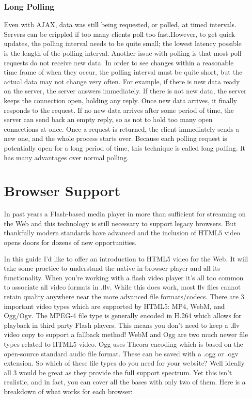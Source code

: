 	\subsubsection{Long Polling}
	Even with AJAX, data was still being requested, or polled, at timed intervals. Servers can be crippled if too many clients poll too fast.However, to get quick updates, the polling interval needs to be quite small; the lowest latency possible is the length of the polling interval. Another issue with polling is that most poll requests do not receive new data. In order to see changes within a reasonable time frame of when they occur, the polling interval must be quite short, but the actual data may not change very often.
	For example, if there is new data ready on the server, the server answers immediately. If there is not new data, the server keeps the connection open, holding any reply. Once new data arrives, it finally responds to the request. If no new data arrives after some period of time, the server can send back an empty reply, so as not to hold too many open connections at once. Once a request is returned, the client immediately sends a new one, and the whole process starts over. Because each polling request is potentially open for a long period of time, this technique is called long polling. It has many advantages over normal polling.

\section{Browser Support}
	In past years a Flash-based media player in more than sufficient for streaming on the Web and this technology is still necessary to support legacy browsers. But thankfully modern standards have advanced and the inclusion of HTML5 video opens doors for dozens of new opportunities.

	In this guide I’d like to offer an introduction to HTML5 video for the Web. It will take some practice to understand the native in-browser player and all its functionality. When you’re working with a flash video player it’s all too common to associate all video formats in .flv. While this does work, most flv files cannot retain quality anywhere near the more advanced file formats/codecs. There are 3 important video types which are supported by HTML5: MP4, WebM, and Ogg/Ogv. The MPEG-4 file type is generally encoded in H.264 which allows for playback in third party Flash players. This means you don’t need to keep a .flv video copy to support a fallback method! WebM and Ogg are two much newer file types related to HTML5 video. Ogg uses Theora encoding which is based on the open-source standard audio file format. These can be saved with a .ogg or .ogv extension.
	So which of these file types do you need for your website? Well ideally all 3 would be great as they provide the full support spectrum. Yet this isn’t realistic, and in fact, you can cover all the bases with only two of them. Here is a breakdown of what works for each browser:

